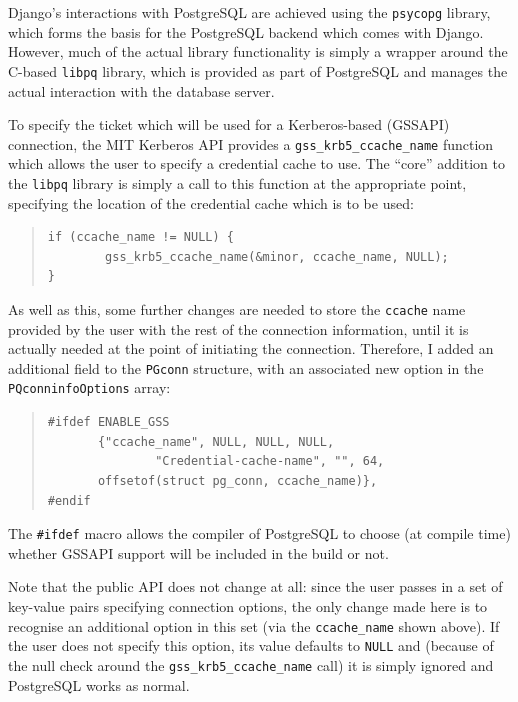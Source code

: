 \documentclass[12pt]{report}
\begin{document}
Django's interactions with PostgreSQL are achieved using the \texttt{psycopg} library, which forms the basis for the PostgreSQL backend which comes with Django. However, much of the actual library functionality is simply a wrapper around the C-based \texttt{libpq} library, which is provided as part of PostgreSQL and manages the actual interaction with the database server.

To specify the ticket which will be used for a Kerberos-based (GSSAPI) connection, the MIT Kerberos API provides a \verb+gss_krb5_ccache_name+ function which allows the user to specify a credential cache to use. The ``core'' addition to the \texttt{libpq} library is simply a call to this function at the appropriate point, specifying the location of the credential cache which is to be used:

\begin{quote}
\begin{samepage}
\begin{verbatim}
if (ccache_name != NULL) {
        gss_krb5_ccache_name(&minor, ccache_name, NULL);
}
\end{verbatim}
\end{samepage}
\end{quote}

As well as this, some further changes are needed to store the \texttt{ccache} name provided by the user with the rest of the connection information, until it is actually needed at the point of initiating the connection. Therefore, I added an additional field to the \texttt{PGconn} structure, with an associated new option in the \texttt{PQconninfoOptions} array:

\begin{quote}
\begin{samepage}
\begin{verbatim}
#ifdef ENABLE_GSS
       {"ccache_name", NULL, NULL, NULL,
               "Credential-cache-name", "", 64,
       offsetof(struct pg_conn, ccache_name)},
#endif
\end{verbatim}
\end{samepage}
\end{quote}

The \verb+#ifdef+ macro allows the compiler of PostgreSQL to choose (at compile time) whether GSSAPI support will be included in the build or not.

Note that the public API does not change at all: since the user passes in a set of key-value pairs specifying connection options, the only change made here is to recognise an additional option in this set (via the \verb+ccache_name+ shown above). If the user does not specify this option, its value defaults to \texttt{NULL} and (because of the null check around the \verb+gss_krb5_ccache_name+ call) it is simply ignored and PostgreSQL works as normal.
\end{document}
